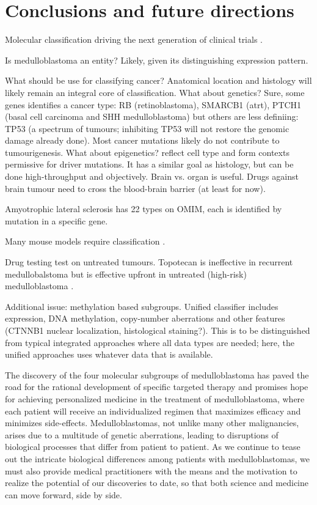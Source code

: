 \chapter{Conclusions and future directions}
\label{ch:conclusion}

Molecular classification driving the next generation of clinical trials .

Is medulloblastoma an entity?
Likely, given its distinguishing expression pattern.

What should be use for classifying cancer?
Anatomical location and histology will likely remain an integral core of classification.
What about genetics? Sure, some genes identifies a cancer type: RB (retinoblastoma), SMARCB1 (\gls{atrt}), PTCH1 (basal cell carcinoma and SHH medulloblastoma) but others are less definiing: TP53 (a spectrum of tumours; inhibiting TP53 will not restore the genomic damage already done). Most cancer mutations likely do not contribute to tumourigenesis.
What about epigenetics? reflect cell type and form contexts permissive for driver mutations. It has a similar goal as histology, but can be done high-throughput and objectively.
Brain vs. organ is useful. Drugs against brain tumour need to cross the blood-brain barrier (at least for now).

Amyotrophic lateral sclerosis has 22 types on OMIM, each is identified by mutation in a specific gene.

Many mouse models require classification .

Drug testing
test on untreated tumours. Topotecan is ineffective in recurrent medullobalstoma  but is effective upfront in untreated (high-risk) medulloblastoma .

Additional issue: methylation based subgroups. Unified classifier includes expression, DNA methylation, copy-number aberrations and other features (CTNNB1 nuclear localization, histological staining?). This is to be distinguished from typical integrated approaches where all data types are needed; here, the unified approaches uses whatever data that is available.

The discovery of the four molecular subgroups of medulloblastoma has paved the road for the rational development of specific targeted therapy and promises hope for achieving personalized medicine in the treatment of medulloblastoma, where each patient will receive an individualized regimen that maximizes efficacy and minimizes side-effects. Medulloblastomas, not unlike many other malignancies, arises due to a multitude of genetic aberrations, leading to disruptions of biological processes that differ from patient to patient. As we continue to tease out the intricate biological differences among patients with medulloblastomas, we must also provide medical practitioners with the means and the motivation to realize the potential of our discoveries to date, so that both science and medicine can move forward, side by side.

